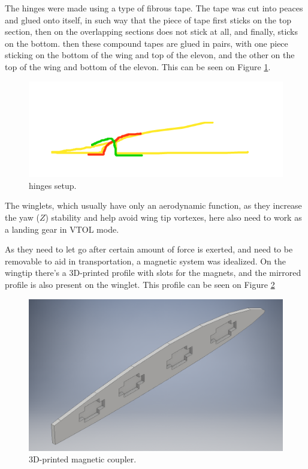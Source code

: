 The hinges were made using a type of fibrous tape. The tape was cut into peaces and glued onto itself, in such way that the piece of tape first sticks on the top section, then on the overlapping sections does not stick at all, and finally, sticks on the bottom.
then these compound tapes are glued in pairs, with one piece sticking on the bottom of the wing and top of the elevon, and the other on the top of the wing and bottom of the elevon. This can be seen on Figure \ref{fig:hinges}.


\begin{figure}[H]
\centering
  \includegraphics[width=\linewidth]{figs/hinges.png}
  \caption{hinges setup.}
  \label{fig:hinges}
\end{figure}
	
	
	
The winglets, which usually have only an aerodynamic function, as they increase the yaw ($Z$) stability and help avoid wing tip vortexes, here also need to work as a landing gear in VTOL mode.

As they need to let go after certain amount of force is exerted, and need to be removable to aid in transportation, a magnetic system was idealized. On the wingtip there's a 3D-printed profile with slots for the magnets, and the mirrored profile is also present on the winglet. This profile can be seen on Figure \ref{fig:magnetcoupler}
	
\begin{figure}[H]
\centering
  \includegraphics[width=\linewidth]{figs/magnetcoupler.png}
  \caption{3D-printed magnetic coupler.}
  \label{fig:magnetcoupler}
\end{figure}
	


